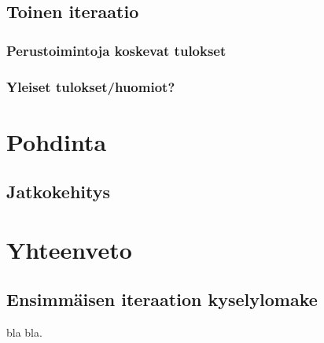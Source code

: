 \documentclass[utf8]{gradu3}
\begin{document}
\section{Toinen iteraatio}
\subsection{Perustoimintoja koskevat tulokset}
\subsection{Yleiset tulokset/huomiot?}

%

\chapter{Pohdinta}

\section{}
\section{}
\section{Jatkokehitys}

%

\chapter{Yhteenveto}

\printbibliography

\appendix
\section{Ensimmäisen iteraation kyselylomake}

bla bla.
\end{document}
